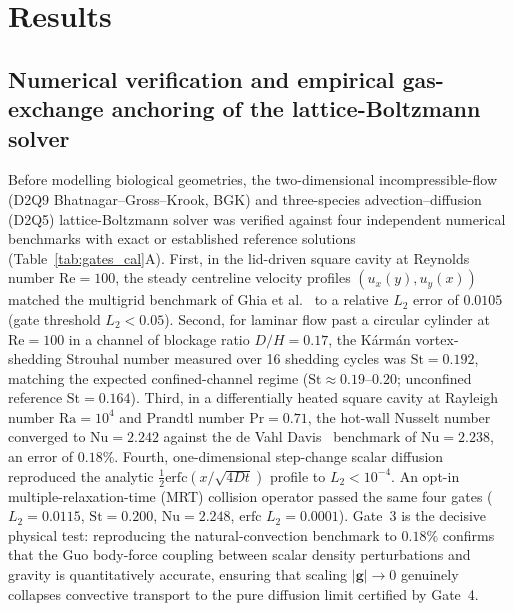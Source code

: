 \documentclass[preprint,11pt,numbers,sort&compress]{elsarticle}
\begin{document}
\section{Results}\label{sec:results}

\subsection{Numerical verification and empirical gas-exchange anchoring of the lattice-Boltzmann solver}\label{sec:validation}

Before modelling biological geometries, the two-dimensional incompressible-flow (D2Q9 Bhatnagar--Gross--Krook, BGK) and three-species advection--diffusion (D2Q5) lattice-Boltzmann solver was verified against four independent numerical benchmarks with exact or established reference solutions (Table~\ref{tab:gates_cal}A). First, in the lid-driven square cavity at Reynolds number $\mathrm{Re} = 100$, the steady centreline velocity profiles $(u_x(y), u_y(x))$ matched the multigrid benchmark of Ghia et al.~\citep{ghia1982} to a relative $L_2$ error of $0.0105$ (gate threshold $L_2 < 0.05$). Second, for laminar flow past a circular cylinder at $\mathrm{Re} = 100$ in a channel of blockage ratio $D/H = 0.17$, the K\'arm\'an vortex-shedding Strouhal number measured over 16 shedding cycles was $\mathrm{St} = 0.192$, matching the expected confined-channel regime ($\mathrm{St}\approx 0.19\text{--}0.20$; unconfined reference $\mathrm{St} = 0.164$). Third, in a differentially heated square cavity at Rayleigh number $\mathrm{Ra} = 10^4$ and Prandtl number $\mathrm{Pr} = 0.71$, the hot-wall Nusselt number converged to $\mathrm{Nu} = 2.242$ against the de Vahl Davis~\citep{devahldavis1983} benchmark of $\mathrm{Nu} = 2.238$, an error of $0.18\%$. Fourth, one-dimensional step-change scalar diffusion reproduced the analytic $\tfrac{1}{2}\mathrm{erfc}(x/\sqrt{4Dt})$ profile to $L_2 < 10^{-4}$. An opt-in multiple-relaxation-time (MRT) collision operator \citep{lallemand2000} passed the same four gates ($L_2 = 0.0115$, $\mathrm{St} = 0.200$, $\mathrm{Nu} = 2.248$, $\mathrm{erfc}$ $L_2 = 0.0001$). Gate~3 is the decisive physical test: reproducing the natural-convection benchmark to $0.18\%$ confirms that the Guo body-force coupling \citep{guo2002} between scalar density perturbations and gravity is quantitatively accurate, ensuring that scaling $|\mathbf{g}|\to 0$ genuinely collapses convective transport to the pure diffusion limit certified by Gate~4.
\end{document}
